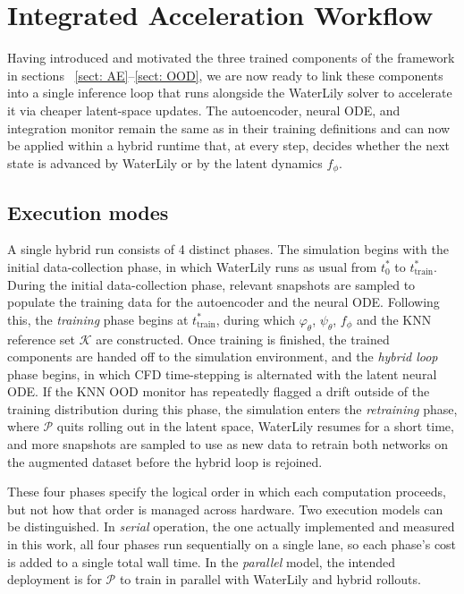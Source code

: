 
\section{Integrated Acceleration Workflow}
\label{sect: acc_workflow}

Having introduced and motivated the three trained components of the framework in sections ~\ref{sect: AE}--\ref{sect: OOD}, we are now ready to link these components into a single inference loop that runs alongside the WaterLily solver to accelerate it via cheaper latent-space updates. The autoencoder, neural ODE, and integration monitor remain the same as in their training definitions and can now be applied within a hybrid runtime that, at every step, decides whether the next state is advanced by WaterLily or by the latent dynamics $f_\phi$. 

\subsection{Execution modes}
\label{subsect: execution_model}

A single hybrid run consists of 4 distinct phases. The simulation begins with the initial data-collection phase, in which WaterLily runs as usual from $t^*_0$ to $t^*_\text{train}$. During the initial data-collection phase, relevant snapshots are sampled to populate the training data for the autoencoder and the neural ODE. Following this, the \emph{training} phase begins at $t^*_\text{train}$, during which $\varphi_\theta$, $\psi_\theta$, $f_\phi$ and the KNN reference set $\mathcal{K}$ are constructed. Once training is finished, the trained components are handed off to the simulation environment, and the \emph{hybrid loop} phase begins, in which CFD time-stepping is alternated with the latent neural ODE. If the KNN OOD monitor has repeatedly flagged a drift outside of the training distribution during this phase, the simulation enters the \emph{retraining} phase, where $\mathcal{P}$ quits rolling out in the latent space, WaterLily resumes for a short time, and more snapshots are sampled to use as new data to retrain both networks on the augmented dataset before the hybrid loop is rejoined.

These four phases specify the logical order in which each computation proceeds, but not how that order is managed across hardware. Two execution models can be distinguished. In \emph{serial} operation, the one actually implemented and measured in this work, all four phases run sequentially on a single lane, so each phase's cost is added to a single total wall time. In the \emph{parallel} model, the intended deployment is for $\mathcal{P}$ to train in parallel with WaterLily and hybrid rollouts.

